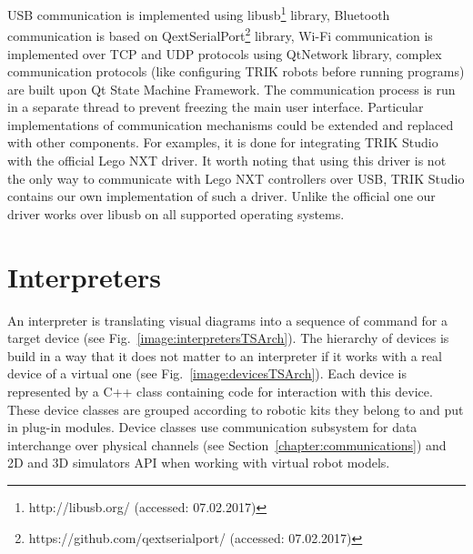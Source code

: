 \documentclass[conference]{IEEEtran}
\begin{document}
USB communication is implemented using libusb\footnote{http://libusb.org/ (accessed: 07.02.2017)} library, Bluetooth communication is based on QextSerialPort\footnote{https://github.com/qextserialport/ (accessed: 07.02.2017)} library, Wi-Fi communication is implemented over TCP and UDP protocols using QtNetwork library, complex communication protocols (like configuring TRIK robots before running programs) are built upon Qt State Machine Framework. The communication process is run in a separate thread to prevent freezing the main user interface. Particular implementations of communication mechanisms could be extended and replaced with other components. For examples, it is done for integrating TRIK Studio with the official Lego NXT driver. It worth noting that using this driver is not the only way to communicate with Lego NXT controllers over USB, TRIK Studio contains our own implementation of such a driver. Unlike the official one our driver works over libusb on all supported operating systems.

\section{Interpreters}
\label{chapter:interpreters}

An interpreter is translating visual diagrams into a sequence of command for a target device (see Fig.~\ref{image:interpretersTSArch}). The hierarchy of devices is build in a way that it does not matter to an interpreter if it works with a real device of a virtual one (see Fig.~\ref{image:devicesTSArch}). Each device is represented by a C++ class containing code for interaction with this device. These device classes are grouped according to robotic kits they belong to and put in plug-in modules. Device classes use communication subsystem for data interchange over physical channels (see Section~\ref{chapter:communications}) and 2D and 3D simulators API when working with virtual robot models. 
\end{document}
